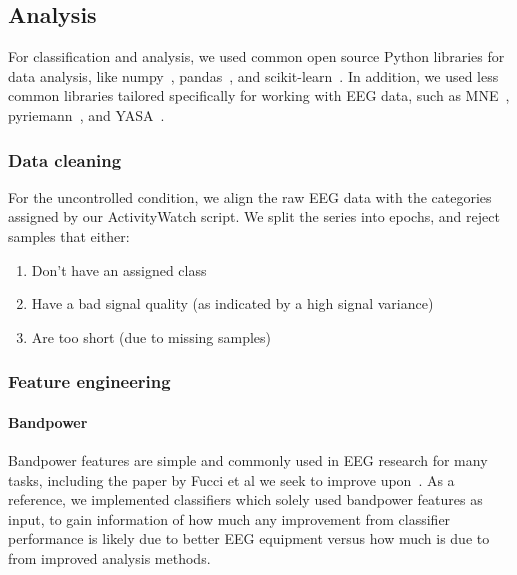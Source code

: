 \documentclass[a4paper]{article}
\begin{document}
\begin{refsection}
    \subsection{Analysis}

        For classification and analysis, we used common open source Python libraries for data analysis, like numpy~\cite{harris2020array}, pandas~\cite{reback2020pandas}, and scikit-learn~\cite{scikit-learn}. In addition, we used less common libraries tailored specifically for working with EEG data, such as MNE~\cite{noauthor_mne-toolsmne-python_2020}, pyriemann~\cite{alexandre_barachant_2020_3715511}, and YASA~\cite{raphael_vallat_raphaelvallatyasa_2020}.

        \subsubsection{Data cleaning}

            For the uncontrolled condition, we align the raw EEG data with the categories assigned by our ActivityWatch script. We split the series into epochs, and reject samples that either:

            \begin{enumerate}
                \item Don't have an assigned class
                \item Have a bad signal quality (as indicated by a high signal variance)
                \item Are too short (due to missing samples)
            \end{enumerate}


        \subsubsection{Feature engineering}

            \paragraph{Bandpower}

                Bandpower features are simple and commonly used in EEG research for many tasks, including the paper by Fucci et al we seek to improve upon~\cite{fucci_replication_2019}. As a reference, we implemented classifiers which solely used bandpower features as input, to gain information of how much any improvement from classifier performance is likely due to better EEG equipment versus how much is due to from improved analysis methods.


\end{refsection}
\end{document}
